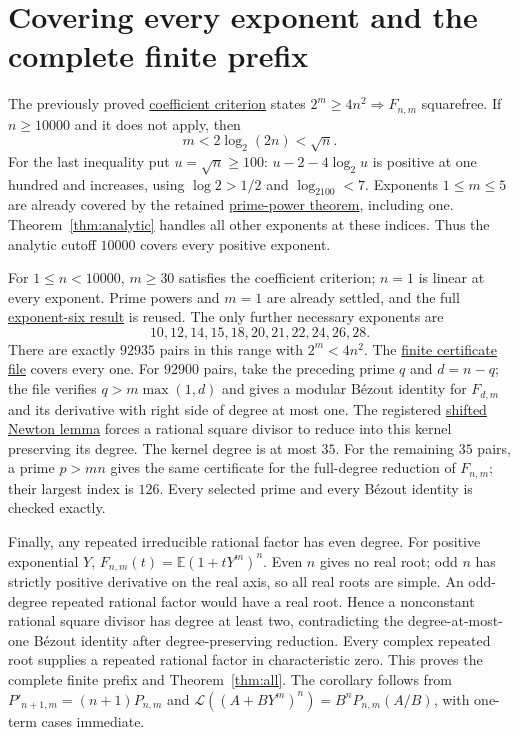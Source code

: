 \documentclass[11pt]{article}
\begin{document}
\section{Covering every exponent and the complete finite prefix}
The previously proved
\href{ALL_EXPONENTS_AND_LARGE_EXPONENT_CUTOFF.tex}{coefficient criterion}
states $2^m\ge4n^2\Rightarrow F_{n,m}$ squarefree.
If $n\ge10000$ and it does not apply, then
\[
 m<2\log_2(2n)<\sqrt n.
\]
For the last inequality put $u=\sqrt n\ge100$:
$u-2-4\log_2u$ is positive at one hundred and increases, using
$\log2>1/2$ and $\log_2100<7$.
Exponents $1\le m\le5$ are already covered by the retained
\href{PRIME_POWER_TWO_TERM_SFC.tex}{prime-power theorem}, including one.
Theorem~\ref{thm:analytic} handles all other exponents at these indices.
Thus the analytic cutoff $10000$ covers every positive exponent.

For $1\le n<10000$, $m\ge30$ satisfies the coefficient criterion;
$n=1$ is linear at every exponent. Prime powers and $m=1$ are already
settled, and the full
\href{EFFECTIVE_EXPONENT_SIX_SIMPLICITY.tex}{exponent-six result} is reused.
The only further necessary exponents are
\[
                  10,12,14,15,18,20,21,22,24,26,28.
\]
There are exactly $92935$ pairs in this range with $2^m<4n^2$.
The \href{all_exponent_prefix_certificates.json}{finite certificate file}
covers every one. For $92900$ pairs, take the preceding prime $q$ and
$d=n-q$; the file verifies $q>m\max(1,d)$ and gives a modular B\'ezout
identity for $F_{d,m}$ and its derivative with right side of degree at most
one. The registered
\href{QUANTITATIVE_SQUAREFREENESS_ALL_EXPONENTS.tex}{shifted Newton lemma}
forces a rational square divisor to reduce into this kernel preserving its
degree. The kernel degree is at most $35$.
For the remaining $35$ pairs, a prime $p>mn$ gives the same certificate
for the full-degree reduction of $F_{n,m}$; their largest index is $126$.
Every selected prime and every B\'ezout identity is checked exactly.

Finally, any repeated irreducible rational factor has even degree.
For positive exponential $Y$, $F_{n,m}(t)=\mathbb E(1+tY^m)^n$.
Even $n$ gives no real root; odd $n$ has strictly positive derivative on
the real axis, so all real roots are simple. An odd-degree repeated
rational factor would have a real root. Hence a nonconstant rational
square divisor has degree at least two, contradicting the degree-at-most-one
B\'ezout identity after degree-preserving reduction. Every complex repeated
root supplies a repeated rational factor in characteristic zero.
This proves the complete finite prefix and Theorem~\ref{thm:all}.
The corollary follows from $P'_{n+1,m}=(n+1)P_{n,m}$ and
$\mathcal L((A+BY^m)^n)=B^nP_{n,m}(A/B)$, with one-term cases immediate.
\end{document}
